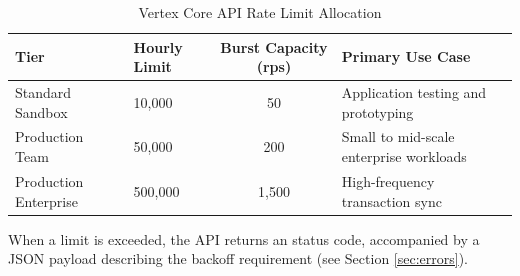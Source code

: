 \begin{table}[h]
\centering
\sffamily
\begin{tabularx}{\linewidth}{l l C L}
\toprule
\textbf{Tier} & \textbf{Hourly Limit} & \textbf{Burst Capacity (rps)} & \textbf{Primary Use Case} \\
\midrule
Standard Sandbox & 10,000 & 50 & Application testing and prototyping \\
Production Team & 50,000 & 200 & Small to mid-scale enterprise workloads \\
Production Enterprise & 500,000 & 1,500 & High-frequency transaction sync \\
\bottomrule
\end{tabularx}
\caption{Vertex Core API Rate Limit Allocation}
\label{tab:rate-limits}
\end{table}

When a limit is exceeded, the API returns an  status code, accompanied by a JSON payload describing the backoff requirement (see Section \ref{sec:errors}).
